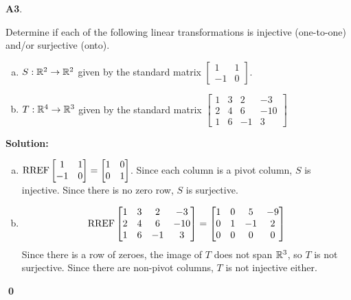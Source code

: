 \documentclass{article}
\newenvironment{problem}[1]
{
  \begin{flushleft}
  \textbf{#1}.
  \ignorespaces
}
{
  \end{flushleft}
}
\newenvironment{solution}
{
  \ignorespaces
  \textbf{Solution:}
}
{
  \ignorespacesafterend
  \begin{flushright}
  {\bfseries \qed}
  \end{flushright}
}
\begin{document}
\begin{problem}{A3}
Determine if each of the following linear transformations is injective (one-to-one) and/or surjective (onto).
\begin{enumerate}[(a)]
\item $S: \mathbb{R}^2 \rightarrow \mathbb{R}^2$ given by the standard matrix $\begin{bmatrix} 1 & 1 \\ -1 & 0 \end{bmatrix}$.
\item $T: \mathbb{R}^4 \rightarrow \mathbb{R}^3$ given by the standard matrix $\begin{bmatrix} 1 & 3 & 2 & -3 \\ 2 & 4 & 6 & -10 \\ 1 & 6 & -1 & 3 \end{bmatrix}$
\end{enumerate}
\end{problem}
\begin{solution}
\begin{enumerate}[(a)]
\item $ \operatorname{RREF}\begin{bmatrix} 1 & 1 \\ -1 & 0 \end{bmatrix}=\begin{bmatrix}1 & 0 \\ 0 & 1 \end{bmatrix}$.  Since each column is a pivot column, $S$ is injective.  Since there is no zero row, $S$ is surjective.
\item $$\operatorname{RREF}\begin{bmatrix}1 & 3 & 2 & -3 \\ 2 & 4 & 6 & -10 \\ 1 & 6 & -1 & 3 \end{bmatrix} = \begin{bmatrix} 1 & 0 & 5 & -9 \\ 0 & 1 & -1 & 2 \\ 0 & 0 & 0 & 0\end{bmatrix}$$
Since there is a row of zeroes, the image of \(T\) does not span \(\mathbb{R}^3\), so \(T\) is not surjective.  Since there are non-pivot columns, \(T\) is not injective either.

\end{enumerate}
\end{solution}
\end{document}
